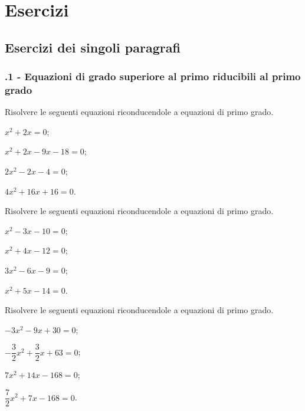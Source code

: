 
\section{Esercizi}

\subsection{Esercizi dei singoli paragrafi}

\subsubsection*{\thechapter.1 - Equazioni di grado superiore al primo riducibili al primo grado}

\begin{esercizio}[\Ast]
\label{ese:20.1}
Risolvere le seguenti equazioni riconducendole a equazioni di primo grado.
\begin{multicols}{2}
\begin{enumeratea}
 \item $x^{2}+2x=0$;
 \item $x^{2}+2x-9x-18=0$;
 \item $2x^{2}-2x-4=0$;
 \item $4x^{2}+16x+16=0$.
\end{enumeratea}
\end{multicols}
\end{esercizio}

\begin{esercizio}[\Ast]
\label{ese:20.2}
Risolvere le seguenti equazioni riconducendole a equazioni di primo grado.
\begin{multicols}{2}
\begin{enumeratea}
 \item $x^{2}-3x-10=0$;
 \item $x^{2}+4x-12=0$;
 \item $3x^{2}-6x-9=0$;
 \item $x^{2}+5x-14=0$.
\end{enumeratea}
\end{multicols}
\end{esercizio}

\begin{esercizio}[\Ast]
\label{ese:20.3}
Risolvere le seguenti equazioni riconducendole a equazioni di primo grado.
\begin{multicols}{2}
\begin{enumeratea}
 \item $-3x^{2}-9x+30=0$;
 \item $-{\dfrac{3}{2}}x^{2}+\dfrac{3}{2}x+63=0$;
 \item $7x^{2}+14x-168=0$;
 \item $\dfrac{7}{2}x^{2}+7x-168=0$.
\end{enumeratea}
\end{multicols}
\end{esercizio}

